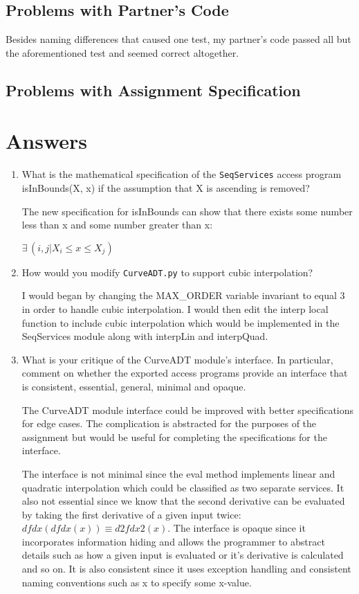 \documentclass[12pt]{article}
\begin{document}
\subsection{Problems with Partner's Code}
Besides naming differences that caused one test, my partner's code passed all but the aforementioned test and seemed correct altogether.

\subsection{Problems with Assignment Specification}

\section{Answers}

\begin{enumerate}

\item What is the mathematical specification of the \texttt{SeqServices} access
  program isInBounds(X, x) if the assumption that X is ascending is removed?

The new specification for isInBounds can show that there exists some number less than x  and some number greater than x:

$\exists\,(i,j| X_i \leq x \leq X_j)$
  

\item How would you modify \texttt{CurveADT.py} to support cubic interpolation?

I would began by changing the MAX\_ORDER variable invariant to equal 3 in order to handle cubic interpolation. I would then edit the interp local function to include cubic interpolation which would be implemented in the SeqServices module along with interpLin and interpQuad.

\item What is your critique of the CurveADT module's interface.  In particular,
  comment on whether the exported access programs provide an interface that is
  consistent, essential, general, minimal and opaque.

The CurveADT module interface could be improved with better specifications for edge cases. The complication is abstracted for the purposes of the assignment but would be useful for completing the specifications for the interface.

The interface is not minimal since the eval method implements linear and quadratic interpolation which could be classified as two separate services. It also not essential since we know that the second derivative can be evaluated by taking the first derivative of a given input twice: $dfdx(dfdx(x)) \equiv d2fdx2(x)$. The interface is opaque since it incorporates information hiding and allows the programmer to abstract details such as how a given input is evaluated or it's derivative is calculated and so on. It is also consistent since it uses exception handling and consistent naming conventions such as x to specify some x-value.


\end{enumerate}
\end{document}
